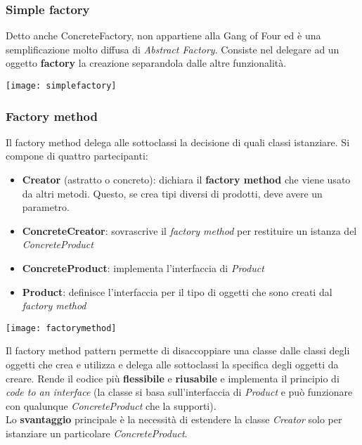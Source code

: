 \subsubsection{Simple factory}
Detto anche ConcreteFactory, non appartiene alla Gang of Four ed è una semplificazione molto diffusa di \textit{Abstract Factory}. Consiste nel delegare ad un oggetto \textbf{factory} la creazione separandola dalle altre funzionalità.
\begin{center}
	\texttt{[image: simplefactory]}
\end{center}

\subsubsection{Factory method}
Il factory method delega alle sottoclassi la decisione di quali classi istanziare. Si compone di quattro partecipanti:
\begin{itemize}
	\item \textbf{Creator} (astratto o concreto): dichiara il \textbf{factory method} che viene usato da altri metodi. Questo, se crea tipi diversi di prodotti, deve avere un parametro.
	\item \textbf{ConcreteCreator}: sovrascrive il \textit{factory method} per restituire un istanza del \textit{ConcreteProduct}
	\item \textbf{ConcreteProduct}: implementa l'interfaccia di \textit{Product}
	\item \textbf{Product}: definisce l'interfaccia per il tipo di oggetti che sono creati dal \textit{factory method}
\end{itemize}
\begin{center}
	\texttt{[image: factorymethod]}
\end{center}

Il factory method pattern permette di disaccoppiare una classe dalle classi degli oggetti che crea e utilizza e delega alle sottoclassi la specifica degli oggetti da creare. Rende il codice più \textbf{flessibile} e \textbf{riusabile} e implementa il principio di \textit{code to an interface} (la classe si basa sull'interfaccia di \textit{Product} e può funzionare con qualunque \textit{ConcreteProduct} che la supporti).\\

Lo \textbf{svantaggio} principale è la necessità di estendere la classe \textit{Creator} solo per istanziare un particolare \textit{ConcreteProduct}.

